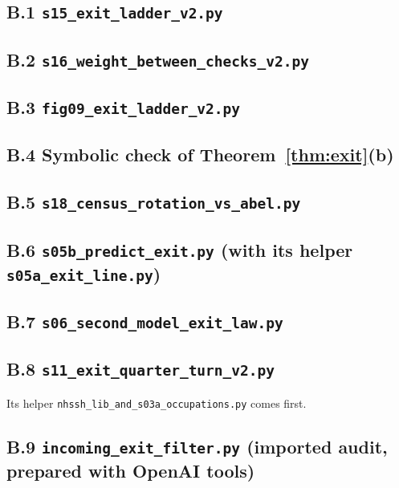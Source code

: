 \documentclass[11pt]{article}
\theoremstyle{definition}
\begin{document}
\subsection*{B.1 \texttt{s15\_exit\_ladder\_v2.py}}


\subsection*{B.2 \texttt{s16\_weight\_between\_checks\_v2.py}}


\subsection*{B.3 \texttt{fig09\_exit\_ladder\_v2.py}}

\subsection*{B.4 Symbolic check of Theorem~\ref{thm:exit}(b)}


\subsection*{B.5 \texttt{s18\_census\_rotation\_vs\_abel.py}}


\subsection*{B.6 \texttt{s05b\_predict\_exit.py} (with its helper \texttt{s05a\_exit\_line.py})}



\subsection*{B.7 \texttt{s06\_second\_model\_exit\_law.py}}


\subsection*{B.8 \texttt{s11\_exit\_quarter\_turn\_v2.py}}\noindent Its helper \texttt{nhssh\_lib\_and\_s03a\_occupations.py} comes first.



\subsection*{B.9 \texttt{incoming\_exit\_filter.py} (imported audit, prepared with OpenAI tools)}


\end{document}
